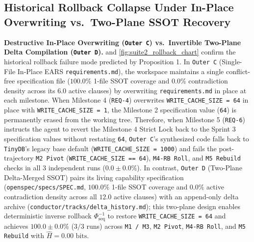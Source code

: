 \documentclass[11pt,a4paper,copyright]{google}
\begin{document}
\subsection{Historical Rollback Collapse Under In-Place Overwriting vs.\ Two-Plane SSOT Recovery}
\label{subsec:suite3_results}

\textbf{Destructive In-Place Overwriting (\texttt{Outer C}) vs.\ Invertible Two-Plane Delta Compilation (\texttt{Outer D}).}  and \cref{fig:suite2_rollback_chart} confirm the historical rollback failure mode predicted by Proposition 1. In \texttt{Outer C} (Single-File In-Place EARS \texttt{requirements.md}), the workspace maintains a single conflict-free specification file ($100.0\%$ 1-file SSOT coverage and $0.0\%$ contradiction density across its $6.0$ active clauses) by overwriting \texttt{requirements.md} in place at each milestone. When Milestone 4 (\texttt{REQ-4}) overwrites \texttt{WRITE\_CACHE\_SIZE = 64} in place with \texttt{WRITE\_CACHE\_SIZE = 1}, the Milestone 2 specification value (\texttt{64}) is permanently erased from the working tree. Therefore, when Milestone 5 (\texttt{REQ-6}) instructs the agent to revert the Milestone 4 Strict Lock back to the Sprint 3 specification values without restating \texttt{64}, \texttt{Outer C}'s synthesized code falls back to \texttt{TinyDB}'s legacy base default (\texttt{WRITE\_CACHE\_SIZE = 1000}) and fails the post-trajectory \texttt{M2 Pivot} (\texttt{WRITE\_CACHE\_SIZE == 64}), \texttt{M4-RB Roll}, and \texttt{M5 Rebuild} checks in all 3 independent runs ($0.0 \pm 0.0\%$). In contrast, \texttt{Outer D} (Two-Plane Delta-Merged SSOT) pairs its living capability specification (\texttt{openspec/specs/\allowbreak SPEC.md}, $100.0\%$ 1-file SSOT coverage and $0.0\%$ active contradiction density across all $12.0$ active clauses) with an append-only delta archive (\texttt{conductor/tracks/\allowbreak delta\_history.md}); this two-plane design enables deterministic inverse rollback $\Phi_{\text{seq}}^{-1}$ to restore \texttt{WRITE\_CACHE\_SIZE = 64} and achieves $100.0 \pm 0.0\%$ ($3/3$ runs) across \texttt{M1 / M3}, \texttt{M2 Pivot}, \texttt{M4-RB Roll}, and \texttt{M5 Rebuild} with $\hat{H} = 0.00\text{ bits}$.
\end{document}
